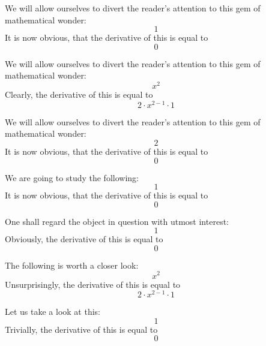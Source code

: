 \documentclass{article}
\begin{document}
We will allow ourselves to divert the reader's attention to this gem of mathematical wonder:
\begin{equation}
1 
\end{equation}
It is now obvious, that the derivative of this is equal to
\begin{equation}
0 
\end{equation}

We will allow ourselves to divert the reader's attention to this gem of mathematical wonder:
\begin{equation}
x ^{2 } 
\end{equation}
Clearly, the derivative of this is equal to
\begin{equation}
2 \cdot x ^{2 - 1 } \cdot 1 
\end{equation}

We will allow ourselves to divert the reader's attention to this gem of mathematical wonder:
\begin{equation}
2 
\end{equation}
It is now obvious, that the derivative of this is equal to
\begin{equation}
0 
\end{equation}

We are going to study the following:
\begin{equation}
1 
\end{equation}
It is now obvious, that the derivative of this is equal to
\begin{equation}
0 
\end{equation}

One shall regard the object in question with utmost interest:
\begin{equation}
1 
\end{equation}
Obviously, the derivative of this is equal to
\begin{equation}
0 
\end{equation}

The following is worth a closer look:
\begin{equation}
x ^{2 } 
\end{equation}
Unsurprisingly, the derivative of this is equal to
\begin{equation}
2 \cdot x ^{2 - 1 } \cdot 1 
\end{equation}

Let us take a look at this:
\begin{equation}
1 
\end{equation}
Trivially, the derivative of this is equal to
\begin{equation}
0 
\end{equation}
\end{document}
